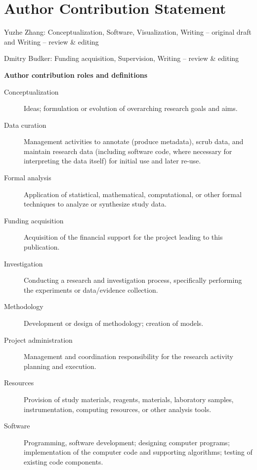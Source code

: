 \documentclass[%
 reprint,
nofootinbib,
 amsmath,amssymb,
 aps,
]{revtex4-2}
\begin{document}
\section*{Author Contribution Statement}


Yuzhe Zhang: Conceptualization, Software, Visualization, Writing -- original draft and Writing -- review \& editing

Dmitry Budker: Funding acquisition, Supervision,  Writing -- review \& editing

\textbf{Author contribution roles and definitions}

\begin{description}

\item[Conceptualization]
Ideas; formulation or evolution of overarching research goals and aims.

\item[Data curation]
Management activities to annotate (produce metadata), scrub data, and maintain research data (including software code, where necessary for interpreting the data itself) for initial use and later re-use.

\item[Formal analysis]
Application of statistical, mathematical, computational, or other formal techniques to analyze or synthesize study data.

\item[Funding acquisition]
Acquisition of the financial support for the project leading to this publication.

\item[Investigation]
Conducting a research and investigation process, specifically performing the experiments or data/evidence collection.

\item[Methodology]
Development or design of methodology; creation of models.

\item[Project administration]
Management and coordination responsibility for the research activity planning and execution.

\item[Resources]
Provision of study materials, reagents, materials, laboratory samples, instrumentation, computing resources, or other analysis tools.

\item[Software]
Programming, software development; designing computer programs; implementation of the computer code and supporting algorithms; testing of existing code components.


\end{description}
\end{document}
